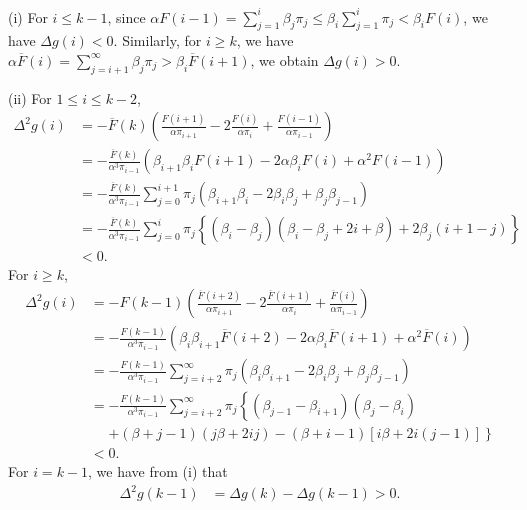 \documentclass[12pt]{article}
\newcommand{\oF}{{\overline{F}}}
\numberwithin{equation}{section}
\begin{document}
(i) For $i\le k-1$, since $\alpha F(i-1)=\sum_{j=1}^i\beta_j\pi_j\le \beta_i\sum_{j=1}^i\pi_j<\beta_iF(i)$, we have $\Delta g(i)<0$. Similarly, for $i\ge k$, we have $\alpha\oF(i)=\sum_{j=i+1}^\infty\beta_j\pi_j>\beta_i\oF(i+1)$, we obtain $\Delta g(i)>0$. 

(ii) For $1\le i\le k-2$,
 \begin{align*}\Delta^2 g(i)&=-\oF(k)\left(\frac{F(i+1)}{\alpha\pi_{i+1}}-2\frac{F(i)}{\alpha\pi_i}+\frac{F(i-1)}{\alpha\pi_{i-1}}\right)\nonumber\\
 &=-\frac{\oF(k)}{\alpha^3\pi_{i-1}}\left(\beta_{i+1}\beta_iF(i+1)-2\alpha\beta_iF(i)+\alpha^2F(i-1)\right)\nonumber\\
 &=-\frac{\oF(k)}{\alpha^3\pi_{i-1}}\sum_{j=0}^{i+1}\pi_j\left(\beta_{i+1}\beta_i-2\beta_i\beta_j+\beta_j\beta_{j-1}\right)\nonumber\\
 &=-\frac{\oF(k)}{\alpha^3\pi_{i-1}}\sum_{j=0}^i\pi_j\left\{(\beta_i-\beta_j)(\beta_i-\beta_j+2i+\beta)+2\beta_j(i+1-j)\right\}\nonumber\\
 &<0.
\end{align*}
For $i\ge k$,
 \begin{align*}\Delta^2 g(i)&=-F(k-1)\left(\frac{\oF(i+2)}{\alpha\pi_{i+1}}-2\frac{\oF(i+1)}{\alpha\pi_i}+\frac{\oF(i)}{\alpha\pi_{i-1}}\right)\nonumber\\
 &=-\frac{F(k-1)}{\alpha^3\pi_{i-1}}\left(\beta_i\beta_{i+1}\oF(i+2)-2\alpha\beta_i\oF(i+1)+\alpha^2\oF(i)\right)\nonumber\\
 &=-\frac{F(k-1)}{\alpha^3\pi_{i-1}}\sum_{j=i+2}^\infty\pi_j\left(\beta_i\beta_{i+1}-2\beta_i\beta_j+\beta_j\beta_{j-1}\right)\nonumber\\
 &=-\frac{F(k-1)}{\alpha^3\pi_{i-1}}\sum_{j=i+2}^\infty\pi_j\left\{(\beta_{j-1}-\beta_{i+1})(\beta_j-\beta_i)\right.\nonumber\\
 &\ \ \ \ \ \  \left.+(\beta+j-1)(j\beta+2ij)-(\beta+i-1)\left[i\beta+2i(j-1)\right]\right\}\nonumber\\
 &<0.
\end{align*}
For $i=k-1$, we have from (i) that
 \begin{align*}\Delta^2 g(k-1)&=\Delta g(k)-\Delta g(k-1)>0.
\end{align*}
\end{document}
